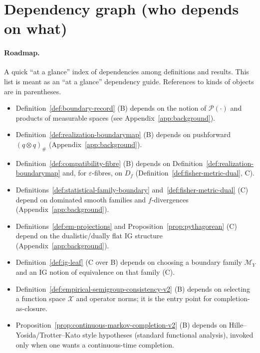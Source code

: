 \documentclass[11pt]{article}
\newcommand{\Pcal}{\mathcal{P}}
\newcommand{\Xcal}{\mathcal{X}}
\begin{document}
\appendix

\section{Dependency graph (who depends on what)}
\label{app:dependency-graph}


\paragraph{Roadmap.}
A quick ``at a glance'' index of dependencies among definitions and results.
\medskip
This list is meant as an ``at a glance'' dependency guide.  References to kinds of objects are in parentheses.

\begin{itemize}[leftmargin=1.6em]
\item Definition~\ref{def:boundary-record} (B) depends on the notion of $\Pcal(\cdot)$ and products of measurable spaces (see Appendix~\ref{app:background}).
\item Definition~\ref{def:realization-boundarymap} (B) depends on pushforward $(q\otimes q)_\#$ (Appendix~\ref{app:background}).
\item Definition~\ref{def:compatibility-fibre} (B) depends on Definition~\ref{def:realization-boundarymap} and, for $\varepsilon$-fibres, on $D_f$ (Definition~\ref{def:fisher-metric-dual}, C).


\item Definitions~\ref{def:statistical-family-boundary} and~\ref{def:fisher-metric-dual} (C) depend on dominated smooth families and $f$-divergences (Appendix~\ref{app:background}).
\item Definitions~\ref{def:em-projections} and Proposition~\ref{prop:pythagorean} (C) depend on the dualistic/dually flat IG structure (Appendix~\ref{app:background}).
\item Definition~\ref{def:ig-leaf} (C over B) depends on choosing a boundary family $\mathcal M_Y$ and an IG notion of equivalence on that family (C).
\item Definition~\ref{def:empirical-semigroup-consistency-v2} (B) depends on selecting a function space $\Xcal$ and operator norms; it is the entry point for completion-as-closure.
\item Proposition~\ref{prop:continuous-markov-completion-v2} (B) depends on Hille--Yosida/Trotter--Kato style hypotheses (standard functional analysis), invoked only when one wants a continuous-time completion.
\end{itemize}
\end{document}
